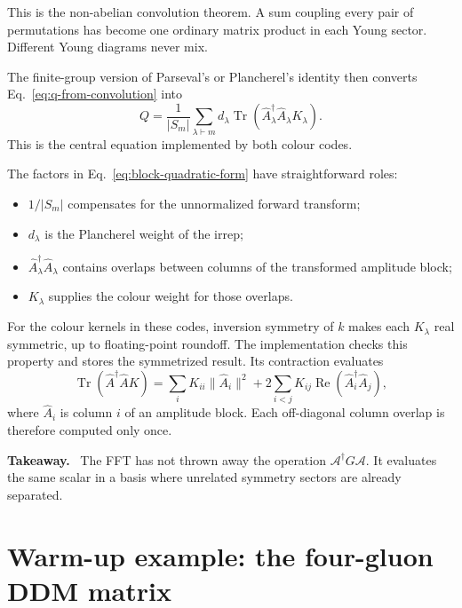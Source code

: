 \documentclass[11pt,a4paper]{article}
\newcommand{\Tr}{\operatorname{Tr}}
\newcommand{\cA}{\mathcal{A}}
\newenvironment{takeaway}
  {\par\medskip\noindent\begin{minipage}{\linewidth}
   \color{blue!50!black}\textbf{Takeaway.}\ \color{black}}
  {\end{minipage}\par\medskip}
\begin{document}
This is the non-abelian convolution theorem.  A sum coupling every pair of
permutations has become one ordinary matrix product in each Young sector.
Different Young diagrams never mix.

The finite-group version of Parseval's or Plancherel's identity then converts
Eq.~\eqref{eq:q-from-convolution} into
\begin{equation}
  Q=\frac{1}{|S_m|}
    \sum_{\lambda\vdash m}d_\lambda
    \Tr\!\left(
      \widehat A_\lambda^\dagger
      \widehat A_\lambda K_\lambda
    \right).
  \label{eq:block-quadratic-form}
\end{equation}
This is the central equation implemented by both colour codes.

The factors in Eq.~\eqref{eq:block-quadratic-form} have straightforward
roles:
\begin{itemize}
  \item $1/|S_m|$ compensates for the unnormalized forward transform;
  \item $d_\lambda$ is the Plancherel weight of the irrep;
  \item $\widehat A_\lambda^\dagger\widehat A_\lambda$ contains overlaps
        between columns of the transformed amplitude block;
  \item $K_\lambda$ supplies the colour weight for those overlaps.
\end{itemize}

For the colour kernels in these codes, inversion symmetry of $k$ makes each
$K_\lambda$ real symmetric, up to floating-point roundoff.  The
implementation checks this property and stores the symmetrized result.  Its
contraction evaluates
\begin{equation}
  \Tr(\widehat A^\dagger\widehat A K)
  =\sum_i K_{ii}\|\widehat A_i\|^2
   +2\sum_{i<j}K_{ij}
      \operatorname{Re}(\widehat A_i^\dagger\widehat A_j),
  \label{eq:symmetric-block-contraction}
\end{equation}
where $\widehat A_i$ is column $i$ of an amplitude block.  Each
off-diagonal column overlap is therefore computed only once.

\begin{takeaway}
The FFT has not thrown away the operation $\cA^\dagger G\cA$.  It evaluates
the same scalar in a basis where unrelated symmetry sectors are already
separated.
\end{takeaway}

\section{Warm-up example: the four-gluon DDM matrix}
\end{document}
